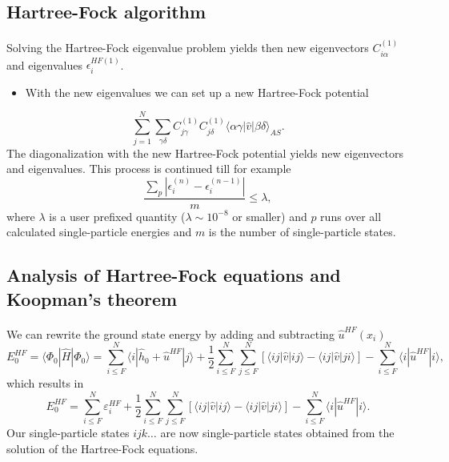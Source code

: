 \documentclass[%
twoside,                 %
final,                   %
10pt]{article}
\begin{document}
\subsection{Hartree-Fock algorithm}

\paragraph{}
Solving the Hartree-Fock eigenvalue problem yields then new eigenvectors $C_{i\alpha}^{(1)}$ and eigenvalues
$\epsilon_i^{HF(1)}$. 
\begin{itemize}
 \item With the new eigenvalues we can set up a new Hartree-Fock potential 
\end{itemize}

\noindent
\[
\sum_{j = 1}^N\sum_{\gamma\delta} C_{j\gamma}^{(1)}C_{j\delta}^{(1)}\langle \alpha\gamma|\hat{v}|\beta\delta\rangle_{AS}.
\]
The diagonalization with the new Hartree-Fock potential yields new eigenvectors and eigenvalues.
This process is continued till for example
\[
\frac{\sum_{p} |\epsilon_i^{(n)}-\epsilon_i^{(n-1)}|}{m} \le \lambda,  
\]
where $\lambda$ is a user prefixed quantity ($\lambda \sim 10^{-8}$ or smaller) and $p$ runs over all calculated single-particle
energies and $m$ is the number of single-particle states.



\subsection{Analysis of Hartree-Fock equations and Koopman's theorem}

\paragraph{}
We can rewrite the ground state energy by adding and subtracting $\hat{u}^{HF}(x_i)$ 
\[
  E_0^{HF} =\langle \Phi_0 | \hat{H} | \Phi_0\rangle = 
\sum_{i\le F}^N \langle i | \hat{h}_0 +\hat{u}^{HF}| j\rangle+ \frac{1}{2}\sum_{i\le F}^N\sum_{j \le F}^N\left[\langle ij |\hat{v}|ij \rangle-\langle ij|\hat{v}|ji\rangle\right]-\sum_{i\le F}^N \langle i |\hat{u}^{HF}| i\rangle,
\]
which results in
\[
  E_0^{HF}
  = \sum_{i\le F}^N \varepsilon_i^{HF} + \frac{1}{2}\sum_{i\le F}^N\sum_{j \le F}^N\left[\langle ij |\hat{v}|ij \rangle-\langle ij|\hat{v}|ji\rangle\right]-\sum_{i\le F}^N \langle i |\hat{u}^{HF}| i\rangle.
\]
Our single-particle states $ijk\dots$ are now single-particle states obtained from the solution of the Hartree-Fock equations.
\end{document}
